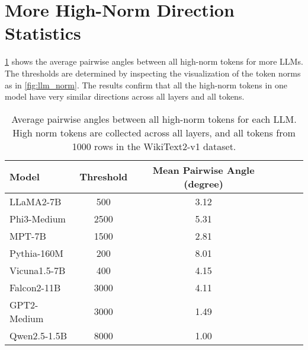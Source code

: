 \section{More High-Norm Direction Statistics}\label{sec:high_norm_statistics}

\cref{tab:more_high_norm_statistics} shows the average pairwise angles between all high-norm tokens for more LLMs.
The thresholds are determined by inspecting the visualization of the token norms as in \cref{fig:llm_norm}.
The results confirm that all the high-norm tokens in one model have very similar directions across all layers and all tokens.

\begin{table}[t]
    \caption{Average pairwise angles between all high-norm tokens for each LLM\@.
        High norm tokens are collected across all layers, and all tokens from 1000 rows in the WikiText2-v1 dataset.
    }\label{tab:more_high_norm_statistics}
    \begin{center}
        \begin{small}
            \begin{sc}
                \begin{tabular}{lccccr}
                    \toprule
                    Model        & Threshold & Mean Pairwise Angle (degree) \\
                    \midrule
                    LLaMA2-7B    & 500       & 3.12                         \\
                    Phi3-Medium  & 2500      & 5.31                         \\
                    MPT-7B       & 1500      & 2.81                         \\
                    Pythia-160M  & 200       & 8.01                         \\
                    Vicuna1.5-7B & 400       & 4.15                         \\
                    Falcon2-11B  & 3000      & 4.11                         \\
                    GPT2-Medium  & 3000      & 1.49                         \\
                    Qwen2.5-1.5B & 8000      & 1.00                         \\
                    \bottomrule
                \end{tabular}
            \end{sc}
        \end{small}
    \end{center}
\end{table}

